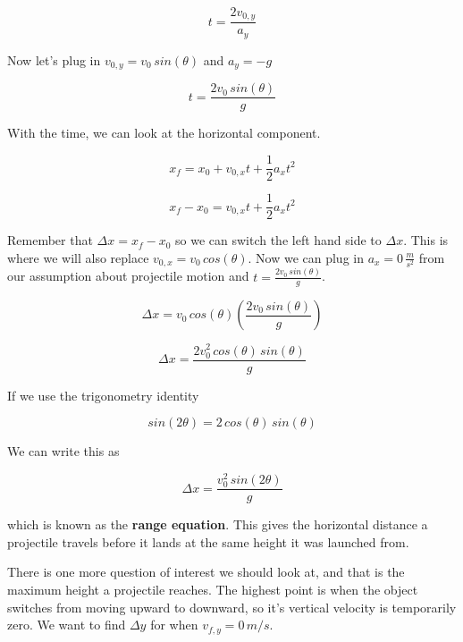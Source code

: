 \documentclass[12pt]{book}
\begin{document}
\begin{equation}
t = \frac{2 v_{0,y}}{a_y}
\end{equation}

Now let's plug in $v_{0,y} = v_0 \, sin(\theta)$ and $a_y = -g$

\begin{equation}
t = \frac{2 v_0 \, sin(\theta)}{g}
\end{equation}

With the time, we can look at the horizontal component.

\begin{equation}
x_f = x_0 + v_{0,x} t + \frac{1}{2} a_x t^2
\end{equation}

\begin{equation}
x_f - x_0 = v_{0,x} t + \frac{1}{2} a_x t^2
\end{equation}

Remember that $\Delta x = x_f - x_0$ so we can switch the left hand side to $\Delta x$. This is where we will also replace $v_{0,x} = v_0 \, cos(\theta)$. Now we can plug in $a_x = 0 \, \frac{m}{s^2}$ from our assumption about projectile motion and $t = \frac{2 v_0 \, sin(\theta)}{g}$.

\begin{equation}
\Delta x = v_0 \, cos(\theta) \left( \frac{2 v_0 \, sin(\theta)}{g} \right)
\end{equation}

\begin{equation}
\Delta x = \frac{2 v_0^2 \, cos(\theta) \, sin(\theta)}{g}
\end{equation}

If we use the trigonometry identity

\begin{equation}
sin(2 \theta) = 2 \, cos(\theta) \, sin(\theta)
\end{equation}

We can write this as

\begin{equation}
\Delta x = \frac{v_0^2 \, sin(2 \theta)}{g}
\end{equation}

which is known as the \textbf{range equation}. This gives the horizontal distance a projectile travels before it lands at the same height it was launched from.

There is one more question of interest we should look at, and that is the maximum height a projectile reaches. The highest point is when the object switches from moving upward to downward, so it's vertical velocity is temporarily zero. We want to find $\Delta y$ for when $v_{f,y} = 0 \, m/s$. 
\end{document}
